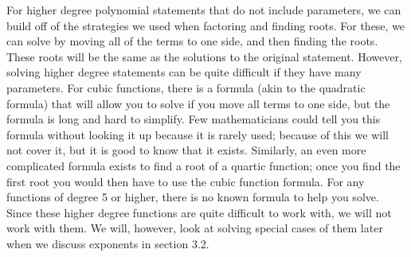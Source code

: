 For higher degree polynomial statements that do not include parameters, we can build off of the strategies we used when factoring and finding roots. For these, we can solve by moving all of the terms to one side, and then finding the roots. These roots will be the same as the solutions to the original statement. However, solving higher degree statements can be quite difficult if they have many parameters. For cubic functions, there is a formula (akin to the quadratic formula) that will allow you to solve if you move all terms to one side, but the formula is long and hard to simplify. Few mathematicians could tell you this formula without looking it up because it is rarely used; because of this we will not cover it, but it is good to know that it exists. Similarly, an even more complicated formula exists to find a root of a quartic function; once you find the first root you would then have to use the cubic function formula. For any functions of degree 5 or higher, there is no known formula to help you solve. Since these higher degree functions are quite difficult to work with, we will not work with them. We will, however, look at solving special cases of them later when we discuss exponents in section 3.2.


